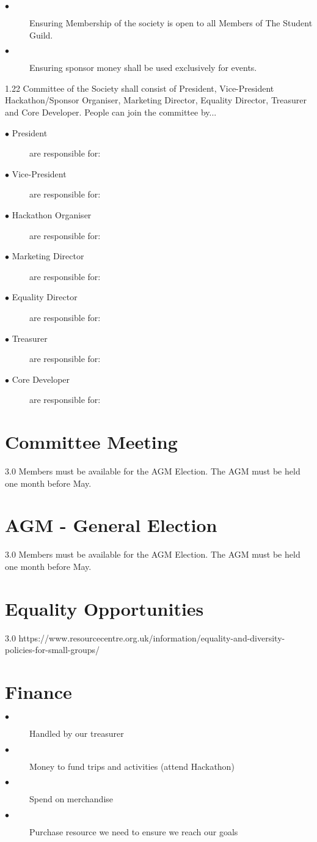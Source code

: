 \documentclass{report}
\begin{document}
\begin{description}
  \item[$\bullet$]Ensuring Membership of the society is open to all Members of The Student Guild.
  \item[$\bullet$]Ensuring sponsor money shall be used exclusively for events.
\end{description}

1.22 Committee of the Society shall consist of President, Vice-President Hackathon/Sponsor Organiser, Marketing Director, Equality Director, Treasurer and Core Developer. People can join the committee by...

\begin{description}
  \item[$\bullet$ President] are responsible for: 
  \item[$\bullet$ Vice-President] are responsible for: 
  \item[$\bullet$ Hackathon Organiser] are responsible for: 
  \item[$\bullet$ Marketing Director] are responsible for: 
  \item[$\bullet$ Equality Director] are responsible for: 
  \item[$\bullet$ Treasurer] are responsible for: 
  \item[$\bullet$ Core Developer] are responsible for: 
\end{description}

\section{Committee Meeting}
3.0 Members must be available for the AGM Election. The AGM must be held one month before May.

\section{AGM - General Election}
3.0 Members must be available for the AGM Election. The AGM must be held one month before May.


\section{Equality Opportunities}
3.0 https://www.resourcecentre.org.uk/information/equality-and-diversity-policies-for-small-groups/

\section{Finance}
\begin{description}
  \item[$\bullet$] Handled by our treasurer
  \item[$\bullet$] Money to fund trips and activities (attend Hackathon)
  \item[$\bullet$] Spend on merchandise
  \item[$\bullet$] Purchase resource we need to ensure we reach our goals
\end{description}
\end{document}
